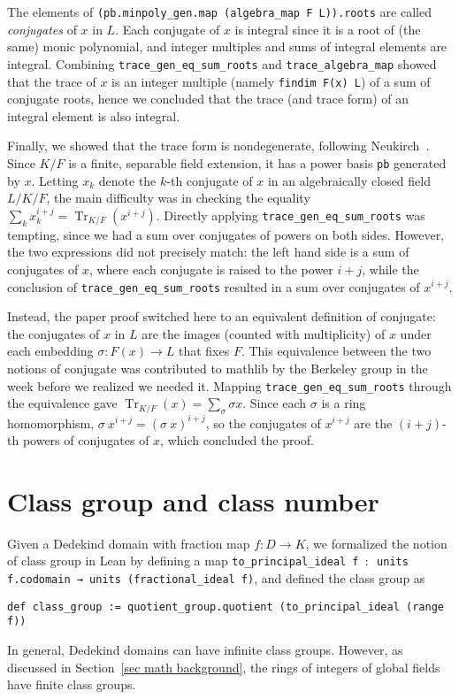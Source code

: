 \documentclass[a4paper,USenglish,cleveref, autoref, thm-restate]{lipics-v2021}
\newcommand{\lean}[1]{\texttt{#1}\xspace}
\DeclareMathOperator{\Tr}{Tr}
\newcommand{\mathlib}{\textsf{mathlib}\xspace}
\begin{document}
The elements of \lean{(pb.minpoly\_gen.map (algebra\_map F L)).roots} are called \emph{conjugates} of $x$ in $L$.
Each conjugate of $x$ is integral since it is a root of (the same) monic polynomial,
and integer multiples and sums of integral elements are integral.
Combining \lean{trace\_gen\_eq\_sum\_roots} and \lean{trace\_algebra\_map} showed that the trace of $x$ is an integer multiple (namely \lean{findim F(x) L}) of a sum of conjugate roots, hence we concluded that the trace (and trace form) of an integral element is also integral.

Finally, we showed that the trace form is nondegenerate, following Neukirch~\cite[Proposition~2.8]{Neukirch}.
Since $K / F$ is a finite, separable field extension, it has a power basis \lean{pb} generated by $x$.
Letting $x_k$ denote the $k$-th conjugate of $x$ in an algebraically closed field $L / K / F$,
the main difficulty was in checking the equality $\sum_k x_k^{i + j} = \Tr_{K / F} (x^{i + j})$.
Directly applying \lean{trace\_gen\_eq\_sum\_roots} was tempting, since we had a sum over conjugates of powers on both sides.
However, the two expressions did not precisely match: the left hand side is a sum of conjugates of $x$, where each conjugate is raised to the power $i + j$,
while the conclusion of \lean{trace\_gen\_eq\_sum\_roots} resulted in a sum over conjugates of $x^{i + j}$.

Instead, the paper proof switched here to an equivalent definition of conjugate:
the conjugates of $x$ in $L$ are the images (counted with multiplicity) of $x$ under each embedding $\sigma \colon F(x) \to L$ that fixes $F$. This equivalence between the two notions of conjugate was contributed to \mathlib by the Berkeley group in the week before we realized we needed it. Mapping \lean{trace\_gen\_eq\_sum\_roots} through the equivalence gave
$\Tr_{K / F}(x) = \sum_{\sigma} \sigma x$.
Since each $\sigma$ is a ring homomorphism, $\sigma\ x^{i + j} = (\sigma\ x)^{i + j}$,
so the conjugates of $x^{i + j}$ are the $(i + j)$-th powers of conjugates of $x$, which concluded the proof.

\section{Class group and class number} \label{sec:class-number}

Given a Dedekind domain with fraction map $f\colon D\to K$, we formalized the notion of class group in Lean by defining a map \lean{to\_principal\_ideal f $:$ units f.codomain → units (fractional\_ideal f)},
and defined the class group as
\begin{lstlisting}
def class_group := quotient_group.quotient (to_principal_ideal (range f))
\end{lstlisting}
In general, Dedekind domains can have infinite class groups. However, as discussed in Section~\ref{sec math background}, the rings of integers of global fields have finite class groups.
\end{document}
